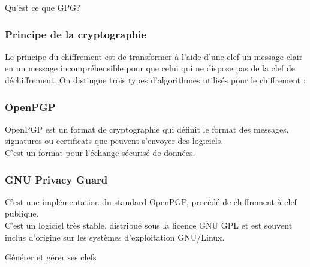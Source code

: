 \documentclass{beamer}
\begin{document}
\begin{frame}
\begin{center}
\Huge{Qu’est ce que GPG? }
\end{center}
\end{frame}


\begin{frame}
\frametitle{Principe de la cryptographie}
Le principe du chiffrement est de transformer à l’aide d’une clef un message clair en un message incompréhensible pour que celui qui ne dispose pas de la clef de déchiffrement. On distingue trois types d’algorithmes utilisés pour le chiffrement :
\begin{itemize}
\end{itemize}
\end{frame}

\begin{frame}
\frametitle{OpenPGP}
OpenPGP est un format de cryptographie qui définit le format
des messages, signatures ou certificats que peuvent s’envoyer
des logiciels.
\\
C’est un format pour l’échange sécurisé de données.
\end{frame}

\begin{frame}
\frametitle{GNU Privacy Guard}
C’est une implémentation du standard OpenPGP, procédé de chiffrement à clef publique. 
\\
C’est un logiciel très stable, distribué sous la licence GNU GPL et est souvent inclus d’origine sur les systèmes d’exploitation GNU/Linux.
\end{frame}

\begin{frame}
\begin{center}
\Huge{Générer et gérer ses clefs }
\end{center}
\end{frame}
\end{document}

